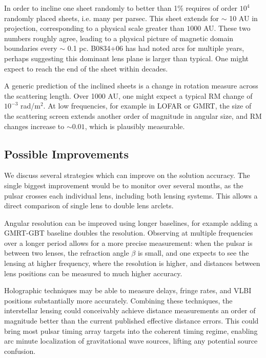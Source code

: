 \documentclass[useAMS,usenatbib]{mn2e}
\begin{document}
In order to incline one sheet randomly to better than 1\% requires of
order $10^4$ randomly placed sheets, i.e. many per parsec.  This sheet
extends for $\sim$ 10 AU in projection, corresponding to a physical
scale greater than $1000$ AU.   These two numbers roughly agree,
leading to a physical picture of magnetic domain boundaries every
$\sim$ 0.1 pc.  B0834+06 has had noted arcs for multiple years,
perhaps suggesting this dominant lens plane is larger than typical.
One might expect to reach the end of the sheet within decades.

A generic prediction of the inclined sheets is a change in rotation
measure across the scattering length.  Over 1000 AU, one might expect
a typical RM change of $10^{-3}$ rad/m$^2$.  At low frequencies, for
example in LOFAR or GMRT, the size of the scattering screen extends
another order of magnitude in angular size, and RM changes increase to
$\sim 0.01$, which is plausibly measurable.

\subsection{Possible Improvements}

We discuss several strategies which can improve on the solution
accuracy.  The single biggest improvement would be to monitor over
several months, as the pulsar crosses each individual lens,
including both lensing systems.  This allows a direct comparison of
single lens to double lens arclets.

Angular resolution can be improved using longer baselines, for example
adding a GMRT-GBT baseline doubles the resolution.  Observing at
multiple frequencies over a longer period allows for a more precise
measurement: when the pulsar is between two lenses, the refraction
angle $\beta$ is small, and one expects to see the lensing at higher
frequency, where the resolution is higher, and distances between
lens positions can be measured to much higher accuracy.

Holographic techniques \citep{2008MNRAS.388.1214W,2014MNRAS.440L..36P}
may be able to measure delays, fringe rates, and VLBI positions
substantially more accurately.  Combining these techniques, the
interstellar lensing could conceivably achieve distance measurements
an order of magnitude better than the current published effective
distance errors.  This could bring most pulsar timing array targets
into the coherent timing regime, enabling arc minute localization of
gravitational wave sources, lifting any potential source confusion.
\end{document}
